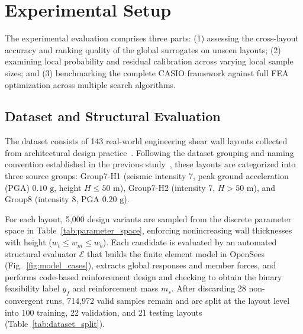 \section{Experimental Setup}
\label{sec:experimental_setup}

The experimental evaluation comprises three parts: (1) assessing the cross-layout accuracy and ranking quality of the global surrogates on unseen layouts; (2) examining local probability and residual calibration across varying local sample sizes; and (3) benchmarking the complete CASIO framework against full FEA optimization across multiple search algorithms.

\subsection{Dataset and Structural Evaluation}
\label{subsec:dataset_structural_evaluation}

The dataset consists of 143 real-world engineering shear wall layouts collected from architectural design practice~\cite{LengRoomGNN2026}. Following the dataset grouping and naming convention established in the previous study~\cite{Liao2021}, these layouts are categorized into three source groups: Group7-H1 (seismic intensity 7, peak ground acceleration (PGA) $0.10\text{ g}$, height $H \leq 50\text{ m}$), Group7-H2 (intensity 7, $H > 50\text{ m}$), and Group8 (intensity 8, PGA $0.20\text{ g}$).

For each layout, 5,000 design variants are sampled from the discrete parameter space in Table~\ref{tab:parameter_space}, enforcing nonincreasing wall thicknesses with height ($w_t \le w_m \le w_b$). Each candidate is evaluated by an automated structural evaluator $\mathcal{E}$ that builds the finite element model in OpenSees~\cite{McKenna2011OpenSees} (Fig.~\ref{fig:model_cases}), extracts global responses and member forces, and performs code-based reinforcement design and checking to obtain the binary feasibility label $y_f$ and reinforcement mass $m_s$. After discarding 28 non-convergent runs, 714,972 valid samples remain and are split at the layout level into 100 training, 22 validation, and 21 testing layouts (Table~\ref{tab:dataset_split}).

